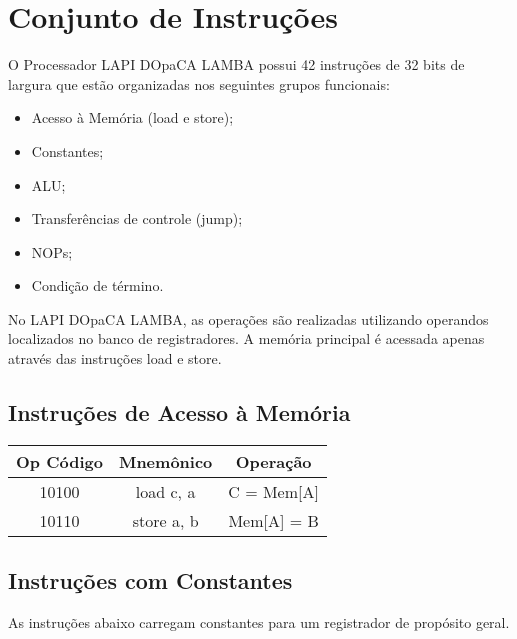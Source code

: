 \documentclass{article}
\begin{document}
  
  \newpage
  \section{Conjunto de Instruções}
  \label{sec:isa}
  O Processador LAPI DOpaCA LAMBA possui 42 instruções de 32 bits de largura que estão organizadas nos seguintes grupos funcionais:
  \begin{itemize}
  \item Acesso à Memória (load e store);
  \item Constantes;  
  \item ALU;
  \item Transferências de controle (jump);
  \item NOPs;
  \item Condição de término.
  \end{itemize}
  
  No LAPI DOpaCA LAMBA, as operações são realizadas utilizando operandos localizados no banco de registradores. A memória principal é acessada apenas através das instruções load e store.
  
  \subsection{Instruções de Acesso à Memória}
  
    \begin{table}[H]
      \begin{center}
        \begin{tabular}[pos]{|c|c|c|} 
        \hline
			\cellcolor[gray]{0.9}\textbf{Op Código} & \cellcolor[gray] {0.9}\textbf{Mnemônico} & \cellcolor[gray] {0.9}\textbf{Operação} \\ \hline    		
           10100 &	load c, a & C = Mem[A]\\ \hline
		   10110 &   store a, b & 	Mem[A] = B \\ \hline
    	\end{tabular}
      \end{center}
    \end{table}
  
  \subsection{Instruções com Constantes}
  
  As instruções abaixo carregam constantes para um registrador de propósito geral.
  
\end{document}
